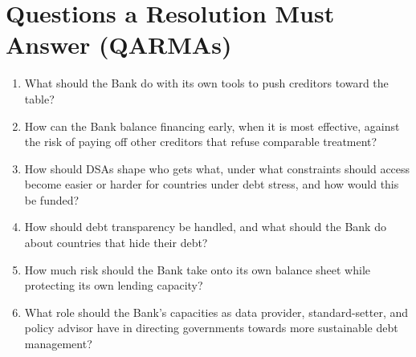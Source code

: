 \section{Questions a Resolution Must Answer (QARMAs)}

\begin{enumerate}
  \item What should the Bank do with its own tools to push creditors toward the table?
  \item How can the Bank balance financing early, when it is most effective, against the risk of paying off other creditors that refuse comparable treatment?
  \item How should DSAs shape who gets what, under what constraints should access become easier or harder for countries under debt stress, and how would this be funded?
  \item How should debt transparency be handled, and what should the Bank do about countries that hide their debt?
  \item How much risk should the Bank take onto its own balance sheet while protecting its own lending capacity?
  \item What role should the Bank’s capacities as data provider, standard-setter, and policy advisor have in directing governments towards more sustainable debt management?
\end{enumerate}
